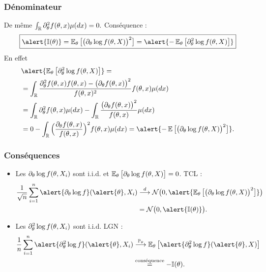 \begin{frame}
\frametitle{Dénominateur}
De même $\int_{\operatorname{{\mathbb R}}} \partial_\theta^2 f(\theta, x) \mu(dx)= 0.$
\alert{Conséquence} :
 $$\boxed{\alert{\mathbb{I}(\truetheta)} = \E_\truetheta\big[\big(\partial_\truetheta \log f(\truetheta, X)\big)^2\big] = \alert{-\E_\truetheta\big[\partial_\truetheta^2 \log f(\truetheta, X)\big]}}$$
En effet
\begin{align*}
&\alert{ \E_\truetheta\big[\partial_\truetheta^2 \log f(\truetheta, X)\big]}  =
\\
& = \int_{\R} \frac{\partial_\truetheta^2 f(\truetheta,x) f(\truetheta, x)-\big(\partial_\truetheta f(\truetheta, x)\big)^2}{f(\truetheta, x)^2}f(\truetheta, x)\mu(dx)\\
&= \int_{\R}\partial_\truetheta^2 f(\truetheta, x)\mu(dx)-\int_{\R} \frac{\big(\partial_\truetheta f(\truetheta, x)\big)^2}{f(\truetheta, x)}\mu(dx) \\
& = 0-\int_{\R} \Big(\frac{\partial_\truetheta f(\truetheta,x)}{f(\truetheta, x)}\Big)^2f(\truetheta, x) \mu(dx) =\alert{ -\E\big[\big(\partial_\truetheta\log f(\truetheta, X)\big)^2\big]}.
\end{align*}
\end{frame}




\begin{frame}
\frametitle{Conséquences}
\begin{itemize}
\item Les $\partial_\theta \log f(\theta, X_i)$ sont i.i.d. et $\operatorname{{\mathbb E}}_\theta \big[\partial_\theta \log f(\theta, X)\big]=0$. TCL :
\begin{align*}\frac{1}{\sqrt{n}} \sum_{i = 1}^n \alert{\partial_\truetheta \log f}(\alert{\truetheta}, X_i) & \stackrel{d}{\longrightarrow} \mathcal N\big(0, \alert{\E_\truetheta \big[\big(\partial_\truetheta \log f(\truetheta, X)\big)^2\big]}\big)\\
& = {\mathcal N}\big(0,\alert{\mathbb{I}(\truetheta)}\big).
\end{align*}
\item Les $\partial_\theta^2 \log f(\theta, X_i)$ sont i.i.d. LGN :
\begin{align*}
\frac{1}{n}\sum_{i = 1}^n \alert{\partial_\truetheta^2 \log f}(\alert{\truetheta}, X_i) & \stackrel{\PP_\truetheta}{\longrightarrow}
\E_\truetheta\big[\alert{\partial_\truetheta^2\log f}(\alert{\truetheta}, X)\big] \\
&\stackrel{\text{conséquence}}{=}-\mathbb{I}(\truetheta).
\end{align*}
\end{itemize}
\end{frame}

